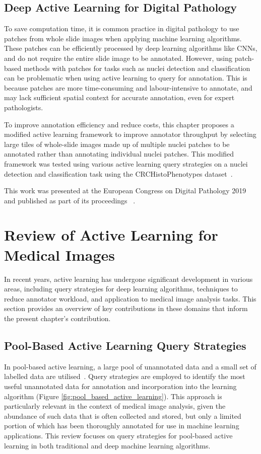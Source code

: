 \subsection{Deep Active Learning for Digital Pathology}
\label{subsec:active_deep_learning}
To save computation time, it is common practice in digital pathology to use patches from whole slide images when applying machine learning algorithms. These patches can be efficiently processed by deep learning algorithms like CNNs, and do not require the entire slide image to be annotated. However, using patch-based methods with patches for tasks such as nuclei detection and classification can be problematic when using active learning to query for annotation. This is because patches are more time-consuming and labour-intensive to annotate, and may lack sufficient spatial context for accurate annotation, even for expert pathologists.

To improve annotation efficiency and reduce costs, this chapter proposes a modified active learning framework to improve annotator throughput by selecting large tiles of whole-slide images made up of multiple nuclei patches to be annotated rather than annotating individual nuclei patches. This modified framework was tested using various active learning query strategies on a nuclei detection and classification task using the CRCHistoPhenotypes dataset~\citep{sirinukunwattana2016locality}.

This work was presented at the European Congress on Digital Pathology 2019 and published as part of its proceedings ~\citep{carse2019active}.



\section{Review of Active Learning for Medical Images}
\label{sec:active_review}
In recent years, active learning has undergone significant development in various areas, including query strategies for deep learning algorithms, techniques to reduce annotator workload, and application to medical image analysis tasks. This section provides an overview of key contributions in these domains that inform the present chapter's contribution.

\subsection{Pool-Based Active Learning Query Strategies}
\label{subsec:active_pool_based}
In pool-based active learning, a large pool of unannotated data and a small set of labelled data are utilised~\citep{settles2009active}. Query strategies are employed to identify the most useful unannotated data for annotation and incorporation into the learning algorithm (Figure \ref{fig:pool_based_active_learning}). This approach is particularly relevant in the context of medical image analysis, given the abundance of such data that is often collected and stored, but only a limited portion of which has been thoroughly annotated for use in machine learning applications. This review focuses on query strategies for pool-based active learning in both traditional and deep machine learning algorithms.


